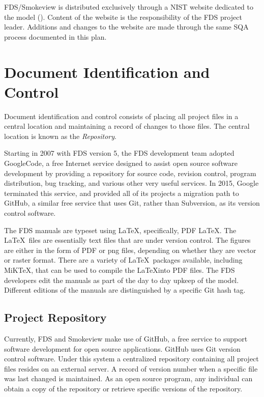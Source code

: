 \documentclass[11pt]{book}
\begin{document}
FDS/Smokeview is distributed exclusively through a NIST website dedicated to the model \linebreak (\href{https://pages.nist.gov/fds/} {}).  Content of the website is the responsibility of the FDS project leader. Additions and changes to the website are made through the same SQA process documented in this plan.


\section{Document Identification and Control}

Document identification and control consists of placing all project files in a central location and maintaining a record of changes to those files.
The central location is known as the {\em Repository}.

Starting in 2007 with FDS version 5, the FDS development team adopted GoogleCode, a free Internet service designed to assist open source software development by providing a repository for source code, revision control, program distribution, bug tracking, and various other very useful services. In 2015, Google terminated this service, and provided all of its projects a migration path to GitHub, a similar free service that uses Git, rather than Subversion, as its version control software.

The FDS manuals are typeset using \LaTeX, specifically, PDF \LaTeX. The \LaTeX\ files are essentially text files that are under version control. The figures are either in the form of PDF or png files, depending on whether they are vector or raster format. There are a variety of \LaTeX\ packages available, including MiKTeX, that can be used to compile the \LaTeX into PDF files. The FDS developers edit the manuals as part of the day to day upkeep of the model. Different editions of the manuals are distinguished by a specific Git hash tag.


\subsection{Project Repository}

Currently, FDS and Smokeview make use of GitHub, a free service to support software development for open source applications. GitHub uses Git version control software. Under this system a centralized repository containing all project files resides on an external server.   A record of version number when a specific file was last changed is maintained. As an open source program, any individual can obtain a copy of the repository or retrieve specific versions of the repository.
\end{document}
